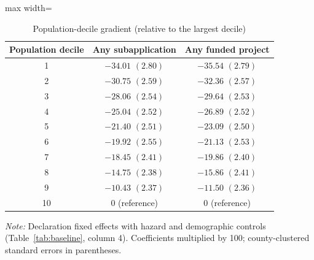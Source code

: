 \begin{table}[!htbp]
\centering
\caption{Population-decile gradient (relative to the largest decile)}
\label{tab:deciles}
\footnotesize
\begin{adjustbox}{max width=\linewidth}
\begin{tabular}{@{}ccc@{}}
\toprule
Population decile & Any subapplication & Any funded project \\
\midrule
1 & $-34.01$ $(2.80)$ & $-35.54$ $(2.79)$ \\
2 & $-30.75$ $(2.59)$ & $-32.36$ $(2.57)$ \\
3 & $-28.06$ $(2.54)$ & $-29.64$ $(2.53)$ \\
4 & $-25.04$ $(2.52)$ & $-26.89$ $(2.52)$ \\
5 & $-21.40$ $(2.51)$ & $-23.09$ $(2.50)$ \\
6 & $-19.92$ $(2.55)$ & $-21.13$ $(2.53)$ \\
7 & $-18.45$ $(2.41)$ & $-19.86$ $(2.40)$ \\
8 & $-14.75$ $(2.38)$ & $-15.86$ $(2.41)$ \\
9 & $-10.43$ $(2.37)$ & $-11.50$ $(2.36)$ \\
10 & 0 (reference) & 0 (reference) \\
\bottomrule
\end{tabular}
\end{adjustbox}
\begin{minipage}{0.8\linewidth}\vspace{4pt}\scriptsize
\textit{Note:} Declaration fixed effects with hazard and demographic controls (Table~\ref{tab:baseline}, column 4). Coefficients multiplied by 100; county-clustered standard errors in parentheses.
\end{minipage}
\end{table}
